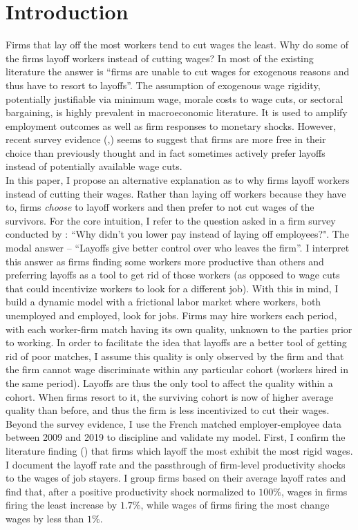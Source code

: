\section{Introduction}

Firms that lay off the most workers tend to cut wages the least. Why do some of the firms layoff workers instead of cutting wages? In most of the existing literature the answer is ``firms are unable to cut wages for exogenous reasons and thus have to resort to layoffs''. The assumption of exogenous wage rigidity, potentially justifiable via minimum wage, morale costs to wage cuts, or sectoral bargaining, is highly prevalent in macroeconomic literature. It is used to amplify employment outcomes as well as firm responses to monetary shocks. However, recent survey evidence (\textcite{davis2025},\textcite{bertheau2025}) seems to suggest that firms are more free in their choice than previously thought and in fact sometimes actively prefer layoffs instead of potentially available wage cuts. \\
In this paper, I propose an alternative explanation as to why firms layoff workers instead of cutting their wages. Rather than laying off workers because they have to, firms \textit{choose} to layoff workers and then prefer to not cut wages of the survivors. For the core intuition, I refer to the question asked in a firm survey conducted by \textcite{bertheau2025}: ``Why didn't you lower pay instead of laying off employees?". The modal answer -- ``Layoffs give better control over who leaves the firm''. I interpret this answer as firms finding some workers more productive than others and preferring layoffs as a tool to get rid of those workers (as opposed to wage cuts that could incentivize workers to look for a different job). With this in mind, I build a dynamic model with a frictional labor market where workers, both unemployed and employed, look for jobs. Firms may hire workers each period, with each worker-firm match having its own quality, unknown to the parties prior to working. In order to facilitate the idea that layoffs are a better tool of getting rid of poor matches, I assume this quality is only observed by the firm and that the firm cannot wage discriminate within any particular cohort (workers hired in the same period). Layoffs are thus the only tool to affect the quality within a cohort. When firms resort to it, the surviving cohort is now of higher average quality than before, and thus the firm is less incentivized to cut their wages. \\
Beyond the survey evidence, I use the French matched employer-employee data between 2009 and 2019 to discipline and validate my model. First, I confirm the literature finding (\textcite{enrlich2024}) that firms which layoff the most exhibit the most rigid wages. I document the layoff rate and the passthrough of firm-level productivity shocks to the wages of job stayers. I group firms based on their average layoff rates and find that, after a positive productivity shock normalized to $100\%$, wages in firms firing the least increase by $1.7\%$, while wages of firms firing the most change wages by less than $1\%$.
